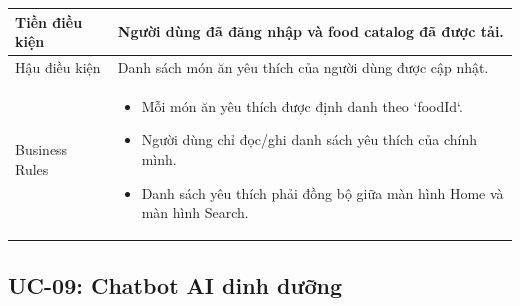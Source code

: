 \begin{longtable}{|p{4cm}|p{11cm}|}
    \hline
    Tiền điều kiện & Người dùng đã đăng nhập và food catalog đã được tải. \\
    \hline
    Hậu điều kiện & Danh sách món ăn yêu thích của người dùng được cập nhật. \\
    \hline
    Business Rules &
        \begin{itemize}[nosep]
            \item Mỗi món ăn yêu thích được định danh theo `foodId`.
            \item Người dùng chỉ đọc/ghi danh sách yêu thích của chính mình.
            \item Danh sách yêu thích phải đồng bộ giữa màn hình Home và màn hình Search.
        \end{itemize} \\
    \hline
\end{longtable}


\subsection{UC-09: Chatbot AI dinh dưỡng}

